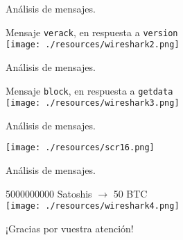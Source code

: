 \documentclass[10pt, xcolor=table]{beamer}
\begin{document}
\begin{frame}{Análisis de mensajes. }
\begin{center}
Mensaje \texttt{verack}, en respuesta a \texttt{version} \\
\hspace{1cm}
	\texttt{[image: ./resources/wireshark2.png]}
\end{center}	
\end{frame}

\begin{frame}{Análisis de mensajes. }
\begin{center}
Mensaje \texttt{block}, en respuesta a \texttt{getdata} \\
\hspace{1cm}
	\texttt{[image: ./resources/wireshark3.png]}
\end{center}	
\end{frame}

\begin{frame}{Análisis de mensajes. }
\begin{center}
	\texttt{[image: ./resources/scr16.png]}
\end{center}	
\end{frame}

\begin{frame}{Análisis de mensajes. }
\begin{center}
5000000000 Satoshis $\longrightarrow$ 50 BTC \\
\hspace{1cm}
	\texttt{[image: ./resources/wireshark4.png]}
\end{center}
\end{frame}

\begin{frame}[standout]
	¡Gracias por vuestra atención!
\end{frame}
\end{document}
